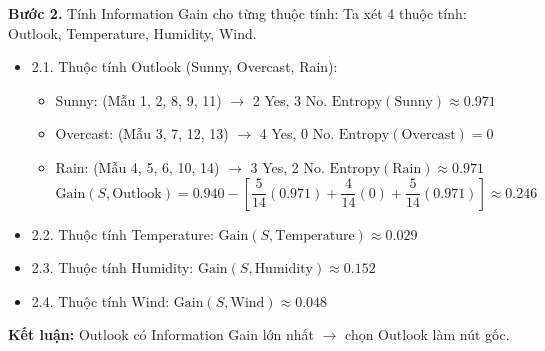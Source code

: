 \textbf{Bước 2.} Tính Information Gain cho từng thuộc tính: Ta xét 4 thuộc tính: Outlook, Temperature, Humidity, Wind.
\begin{itemize}
    \item 2.1. Thuộc tính Outlook (Sunny, Overcast, Rain):
    \begin{itemize}
        \item Sunny: (Mẫu 1, 2, 8, 9, 11) $\rightarrow$ 2 Yes, 3 No. $\text{Entropy}(\text{Sunny}) \approx 0.971$
        \item Overcast: (Mẫu 3, 7, 12, 13) $\rightarrow$ 4 Yes, 0 No. $\text{Entropy}(\text{Overcast}) = 0$
        \item Rain: (Mẫu 4, 5, 6, 10, 14) $\rightarrow$ 3 Yes, 2 No. $\text{Entropy}(\text{Rain}) \approx 0.971$
        $$\text{Gain}(S, \text{Outlook}) = 0.940 - \left[\frac{5}{14}(0.971) + \frac{4}{14}(0) + \frac{5}{14}(0.971)\right] \approx 0.246$$
    \end{itemize}
    \item 2.2. Thuộc tính Temperature: $\text{Gain}(S, \text{Temperature}) \approx 0.029$
    \item 2.3. Thuộc tính Humidity: $\text{Gain}(S, \text{Humidity}) \approx 0.152$
    \item 2.4. Thuộc tính Wind: $\text{Gain}(S, \text{Wind}) \approx 0.048$
\end{itemize}
\textbf{Kết luận:} Outlook có Information Gain lớn nhất $\rightarrow$ chọn Outlook làm nút gốc.

